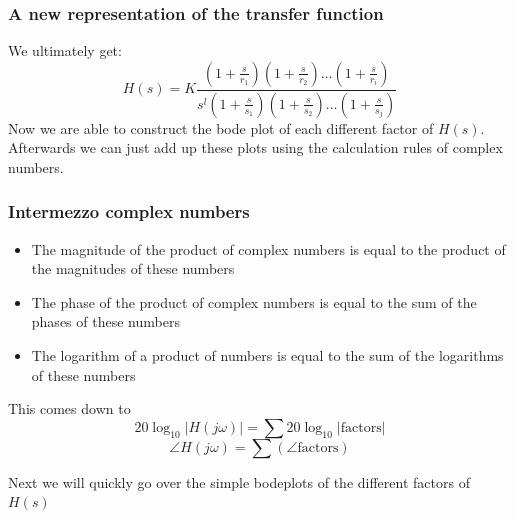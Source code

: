 \begin{frame}
\frametitle{A new representation of the transfer function}

We ultimately get: $$H(s) = K \frac{(1+\frac{s}{r_1}) (1+\frac{s}{r_2}) \ldots (1+\frac{s}{r_i})}{s^l (1+\frac{s}{s_1}) (1+\frac{s}{s_2}) \ldots (1 + \frac{s}{s_j})}$$
Now we are able to construct the bode plot of each different factor of $H(s)$. Afterwards we can just add up these plots using the calculation rules of complex numbers.

  
\end{frame}



\begin{frame}
\frametitle{Intermezzo complex numbers}
\begin{itemize}
\item The magnitude of the product of complex numbers is equal to the product of the magnitudes of these numbers
\item The phase of the product of complex numbers is equal to the sum of the phases of these numbers
\item The logarithm of a product of numbers is equal to the sum of the logarithms of these numbers

\end{itemize}
This comes down to 
$$ 20\log_{10}|H(j\omega)| = \sum 20\log_{10}|\text{factors}| $$ 
$$ \angle H(j\omega) = \sum(\angle \text{factors})$$

Next we will quickly go over the simple bodeplots of the different factors of $H(s)$

\end{frame}



